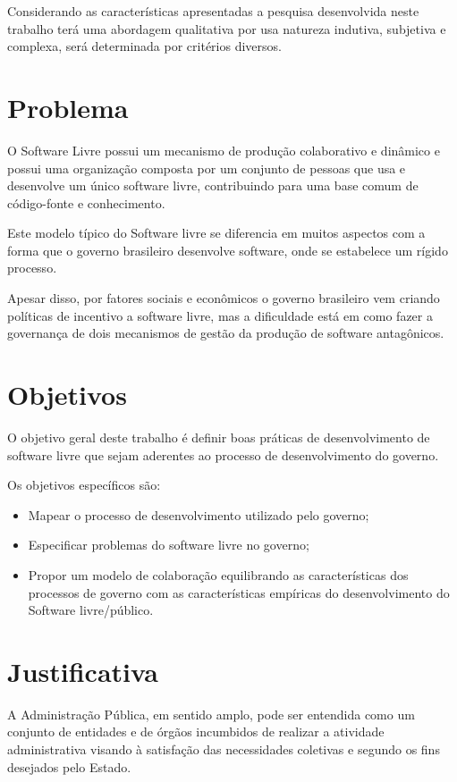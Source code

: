 Considerando as características apresentadas a pesquisa desenvolvida neste trabalho
terá uma abordagem qualitativa por usa natureza indutiva, subjetiva e complexa, será 
determinada por critérios diversos.  

\section{Problema}

O Software Livre possui um mecanismo de produção colaborativo e dinâmico 
e possui uma organização composta por um conjunto de pessoas que usa e desenvolve 
um único software livre, contribuindo para uma base comum de código-fonte e 
conhecimento.\cite{reis2003caracterizacc}

Este modelo típico do Software livre se diferencia em muitos aspectos com a forma
que o governo brasileiro desenvolve software, onde se estabelece um rígido processo.

Apesar disso, por fatores sociais e econômicos o governo brasileiro vem
criando políticas de incentivo a software livre, mas a dificuldade está em como
fazer a governança de dois mecanismos de gestão da produção de software antagônicos. 

\section{Objetivos}

O objetivo geral deste trabalho é definir boas práticas de desenvolvimento de 
software livre que sejam aderentes ao processo de desenvolvimento do governo.

Os objetivos específicos são:

\begin{itemize}
\item Mapear o processo de desenvolvimento utilizado pelo governo;
\item Especificar problemas do software livre no governo;
\item Propor um modelo de colaboração equilibrando as características 
dos processos de governo com as características empíricas do desenvolvimento 
do Software livre/público.
\end{itemize}

\section{Justificativa}

A Administração Pública, em sentido amplo, pode ser entendida como um conjunto 
de entidades e de órgãos incumbidos de realizar a atividade administrativa visando 
à satisfação das necessidades coletivas e segundo os fins desejados pelo Estado.
\cite{coutinho2012uso}

